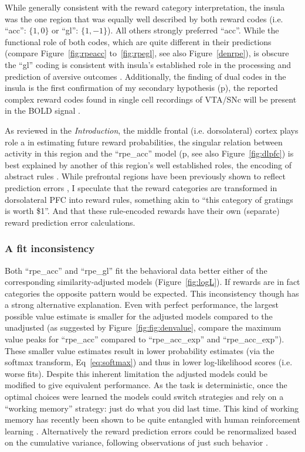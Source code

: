 \documentclass[doc,12pt]{apa}        %
\begin{document}
While generally consistent with the reward category interpretation, the insula was the one region that was equally well described by both reward codes (i.e. ``acc'': $\{1,0\}$ or ``gl'': $\{1,-1\}$).  All others strongly preferred ``acc''.  While the functional role of both codes, which are quite different in their predictions (compare Figure~\ref{fig:rpeacc} to~\ref{fig:rpegl}, see also Figure~\ref{denrpe}), is obscure the ``gl'' coding is consistent with insula's established role in the processing and prediction of aversive outcomes \cite{Chua:1999p9833,Phillips:1998p9834,Buchel:1998p9836,Elliott:2000p1637}.  Additionally, the finding of dual codes in the insula is the first confirmation of my secondary hypothesis (p\pageref{subsub:codesandfits}), the reported complex reward codes found in single cell recordings of VTA/SNc will be present in the BOLD signal \cite{Kim:2006p1063,Matsumoto:2009p7219,Smith:2011p8133}.

As reviewed in the \emph{Introduction}, the middle frontal (i.e. dorsolateral) cortex plays role a in estimating future reward probabilities, the singular relation between activity in this region and the ``rpe\_acc'' model (p\pageref{subsub:onsheet}, see also Figure~\ref{fig:dlpfc}) is best explained by another of this region's well established roles, the encoding of abstract rules \cite{Wallis:2001p8129}.  While prefrontal regions have been previously shown to reflect prediction errors \cite{Ramnani:2004p5390}, I speculate that the reward categories are transformed in dorsolateral PFC into reward rules, something akin to ``this category of gratings is worth \$1''.  And that these rule-encoded rewards have their own (separate) reward prediction error calculations.

\subsubsection{A fit inconsistency}
\label{subsub:inconsistency}
Both ``rpe\_acc'' and ``rpe\_gl'' fit the behavioral data better either of the corresponding similarity-adjusted models (Figure~\ref{fig:logL}).  If rewards are in fact categories the opposite pattern would be expected.  This inconsistency though has a strong alternative explanation.  Even with perfect performance, the largest possible value estimate is smaller for the adjusted models compared to the unadjusted (as suggested by Figure~\ref{fig:fig:denvalue}, compare the maximum value peaks for ``rpe\_acc'' compared to ``rpe\_acc\_exp'' and ``rpe\_acc\_exp'').  These smaller value estimates result in lower probability estimates (via the softmax transform, Eq~\ref{eq:softmax}) and thus in lower log-likelihood scores (i.e. worse fits).  Despite this inherent limitation the adjusted models could be modified to give equivalent performance.  As the task is deterministic, once the optimal choices were learned the models could switch strategies and rely on a ``working memory'' strategy: just do what you did last time.  This kind of working memory has recently been shown to be quite entangled with human reinforcement learning \cite{Collins:2012p9779}.  Alternatively the reward prediction errors could be renormalized based on the cumulative variance, following observations of just such behavior \cite{Tobler:2005p6373}.
\end{document}
